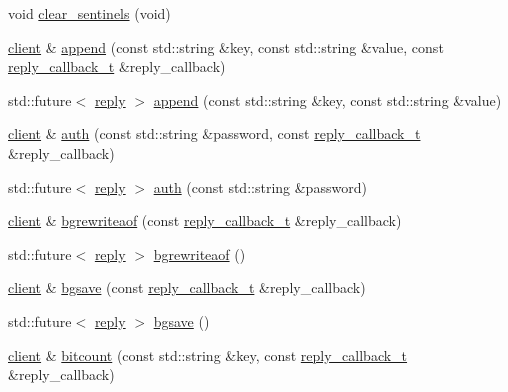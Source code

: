 \begin{DoxyCompactItemize}
void \hyperlink{classcpp__redis_1_1client_a68cd15d1cc30302237e3a400e2ac43f5}{clear\+\_\+sentinels} (void)
\item 
\hyperlink{classcpp__redis_1_1client}{client} \& \hyperlink{classcpp__redis_1_1client_ad60647638d8758103e98894457652b84}{append} (const std\+::string \&key, const std\+::string \&value, const \hyperlink{classcpp__redis_1_1client_a061a1140d36d2eaeda82b09a0bb3f9f2}{reply\+\_\+callback\+\_\+t} \&reply\+\_\+callback)
\item 
std\+::future$<$ \hyperlink{classcpp__redis_1_1reply}{reply} $>$ \hyperlink{classcpp__redis_1_1client_a3e50dddad0b4c9eca58d970bdc4e78da}{append} (const std\+::string \&key, const std\+::string \&value)
\item 
\hyperlink{classcpp__redis_1_1client}{client} \& \hyperlink{classcpp__redis_1_1client_a3ee834ca9c0810d2eafcf04de9dc0670}{auth} (const std\+::string \&password, const \hyperlink{classcpp__redis_1_1client_a061a1140d36d2eaeda82b09a0bb3f9f2}{reply\+\_\+callback\+\_\+t} \&reply\+\_\+callback)
\item 
std\+::future$<$ \hyperlink{classcpp__redis_1_1reply}{reply} $>$ \hyperlink{classcpp__redis_1_1client_a899b98d4d6da0ffdf8780933fe088fd1}{auth} (const std\+::string \&password)
\item 
\hyperlink{classcpp__redis_1_1client}{client} \& \hyperlink{classcpp__redis_1_1client_a9873619c2c1ff820fde17e27ade096c8}{bgrewriteaof} (const \hyperlink{classcpp__redis_1_1client_a061a1140d36d2eaeda82b09a0bb3f9f2}{reply\+\_\+callback\+\_\+t} \&reply\+\_\+callback)
\item 
std\+::future$<$ \hyperlink{classcpp__redis_1_1reply}{reply} $>$ \hyperlink{classcpp__redis_1_1client_a82959607f4cbe9dac195d27621a9cc64}{bgrewriteaof} ()
\item 
\hyperlink{classcpp__redis_1_1client}{client} \& \hyperlink{classcpp__redis_1_1client_a102a4f3572072a5bc26681082ad16a2b}{bgsave} (const \hyperlink{classcpp__redis_1_1client_a061a1140d36d2eaeda82b09a0bb3f9f2}{reply\+\_\+callback\+\_\+t} \&reply\+\_\+callback)
\item 
std\+::future$<$ \hyperlink{classcpp__redis_1_1reply}{reply} $>$ \hyperlink{classcpp__redis_1_1client_a632ef40c52f46eb4948768006adfead5}{bgsave} ()
\item 
\hyperlink{classcpp__redis_1_1client}{client} \& \hyperlink{classcpp__redis_1_1client_aa6c9c15d8676a1cee3d8409ab898a049}{bitcount} (const std\+::string \&key, const \hyperlink{classcpp__redis_1_1client_a061a1140d36d2eaeda82b09a0bb3f9f2}{reply\+\_\+callback\+\_\+t} \&reply\+\_\+callback)

\end{DoxyCompactItemize}
